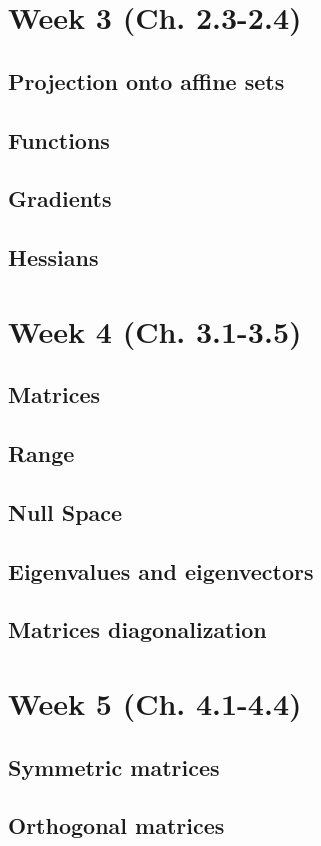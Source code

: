 \documentclass{article}
\begin{document}
\section{Week 3 (Ch. 2.3-2.4)}
    \subsection{Projection onto affine sets}
    \subsection{Functions}
    \subsection{Gradients}
    \subsection{Hessians}

\section{Week 4 (Ch. 3.1-3.5)}
    \subsection{Matrices}
    \subsection{Range}
    \subsection{Null Space}
    \subsection{Eigenvalues and eigenvectors}
    \subsection{Matrices diagonalization}

\section{Week 5 (Ch. 4.1-4.4)}
    \subsection{Symmetric matrices}
    \subsection{Orthogonal matrices}
\end{document}
